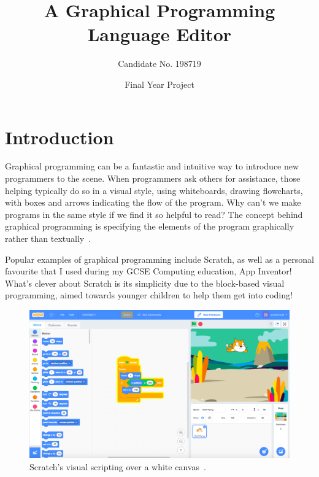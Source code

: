 \documentclass[a4paper, 12pt]{article}
\begin{document}
    \title{A Graphical Programming Language Editor}
    \author{Candidate No. 198719}
    \date{Final Year Project}
    \clearpage\maketitle
    \thispagestyle{empty}

    \newpage\clearpage\thispagestyle{empty}
    \tableofcontents
    \newpage
    \setcounter{page}{1}

    \section{Introduction}
    Graphical programming can be a fantastic and intuitive way to introduce new programmers to
    the scene. When programmers ask others for assistance, those helping typically do so in a visual 
    style, using whiteboards, drawing flowcharts, with boxes and arrows indicating the flow 
    of the program. Why can't we make programs in the same style if we find it so helpful to read? 
    The concept behind graphical programming is specifying the elements of the program graphically 
    rather than textually~\cite{dehouck2015maturity}.

    Popular examples of graphical programming include Scratch, as well as a personal favourite that 
    I used during my GCSE Computing education, App Inventor!
    What's clever about Scratch is its simplicity due to the block-based visual programming, aimed 
    towards younger children to help them get into coding!

    \begin{figure}[h]
        \centering
        \includegraphics[width=160mm]{scratch_image}
        \caption{Scratch's visual scripting over a white canvas~\cite{thescratchteam}.}
    \end{figure}
\end{document}
